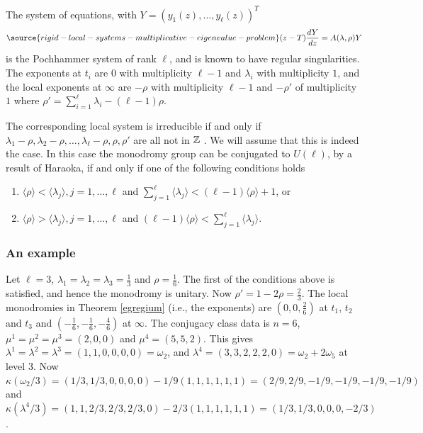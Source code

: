 The system of equations, with $Y=(y_1(z),\dots,y_{\ell}(z))^T$
\begin{equation}\label{math383sys}
\source{rigid-local-systems-multiplicative-eigenvalue-problem}
(z-T)\frac{dY}{dz}= A(\lambda,\rho)Y
\end{equation}
is the Pochhammer system of rank $\ell$, and is known to have regular singularities. The exponents at $t_i$ are $0$ with multiplicity $\ell-1$ and $\lambda_i$ with multiplicity $1$, and
the local exponents at $\infty$ are $-\rho$ with multiplicity $\ell-1$ and $-\rho'$ of multiplicity $1$ where
$\rho'=\sum_{i=1}^{\ell}\lambda_i -(\ell-1)\rho.$



The corresponding local system is irreducible if and only if
$\lambda_1-\rho,\lambda_2-\rho,\dots,\lambda_{\ell}-\rho,\rho,\rho'$ are all not in $\Bbb{Z}$ \cite[Proposition 1.3]{Haraoka}. We will assume that this is indeed the case. In this case the monodromy group can be conjugated to $U(\ell)$, by a result of Haraoka, if and only if one of the following conditions holds \cite[Proposition 1.5]{Haraoka}
\begin{enumerate}
\item $\langle\rho\rangle <\langle\lambda_j\rangle, j=1,\dots,\ell$ and $\sum_{j=1}^{\ell} \langle\lambda_j\rangle<(\ell-1)\langle\rho\rangle +1$, or
\item $\langle\rho\rangle >\langle\lambda_j\rangle, j=1,\dots,\ell$ and $(\ell-1) \langle\rho\rangle< \sum_{j=1}^{\ell} \langle\lambda_j\rangle$.
\end{enumerate}
\iffalse
\subsubsection{An example}
Let $\ell=3$, $\lambda_1=\lambda_2=\lambda_3=\frac{1}{3}$ and $\rho= \frac{1}{6}$. The first of the conditions
above is satisfied, and hence the monodromy is unitary. Now $\rho'=1-2\rho=\frac{2}{3}$. The local monodromies in Theorem \ref{egregium} (i.e., the exponents) are $(0,0,\frac{2}{6})$ at $t_1$, $t_2$ and $t_3$ and $(-\frac{1}{6},-\frac{1}{6},-\frac{4}{6})$ at $\infty$. The conjugacy class data is $n=6$, $\mu^1=\mu^2=\mu^3=(2,0,0)$
and $\mu^4=(5,5,2)$. This gives $\lambda^1=\lambda^2=\lambda^3=(1,1,0,0,0,0)=\omega_2$, and $\lambda^4 = (3,3,2,2,2,0)=\omega_2+2\omega_5$ at level $3$. Now $\kappa(\omega_2/3)=(1/3,1/3,0,0,0,0)-1/9(1,1,1,1,1,1)= (2/9,2/9,-1/9,-1/9,-1/9,-1/9)$ and $\kappa(\lambda^4/3)= (1,1,2/3,2/3,2/3,0)-2/3(1,1,1,1,1,1)=(1/3,1/3,0,0,0,-2/3)$.


